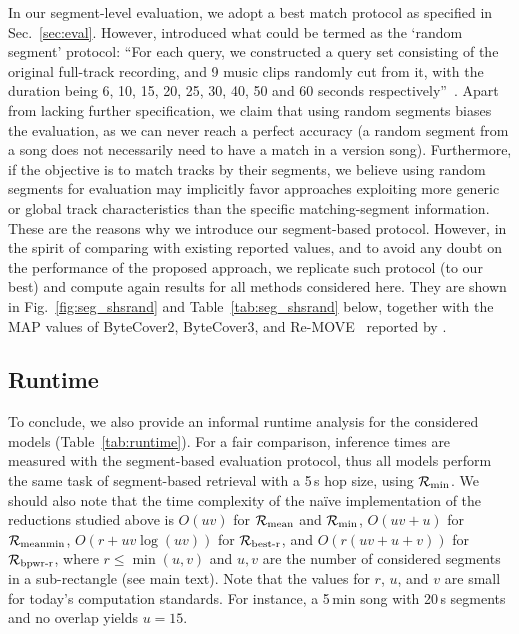In our segment-level evaluation, we adopt a best match protocol as specified in Sec.~\ref{sec:eval}. However, \citet{du_bytecover3_2023} introduced what could be termed as the `random segment' protocol: ``For each query, we constructed a query set consisting of the original full-track recording, and 9 music clips randomly cut from it, with the duration being 6, 10, 15, 20, 25, 30, 40, 50 and 60 seconds respectively''~\cite{du_bytecover3_2023}. Apart from lacking further specification, we claim that using random segments biases the evaluation, as we can never reach a perfect accuracy (a random segment from a song does not necessarily need to have a match in a version song). Furthermore, if the objective is to match tracks by their segments, we believe using random segments for evaluation may implicitly favor approaches exploiting more generic or global track characteristics than the specific matching-segment information. These are the reasons why we introduce our segment-based protocol. However, in the spirit of comparing with existing reported values, and to avoid any doubt on the performance of the proposed approach, we replicate such protocol (to our best) and compute again results for all methods considered here. They are shown in Fig.~\ref{fig:seg_shsrand} and Table~\ref{tab:seg_shsrand} below, together with the MAP values of ByteCover2, ByteCover3, and Re-MOVE~\cite{yesiler_less_2020} reported by \citet{du_bytecover3_2023}.

\subsection{Runtime}

To conclude, we also provide an informal runtime analysis for the considered models (Table~\ref{tab:runtime}). For a fair comparison, inference times are measured with the segment-based evaluation protocol, thus all models perform the same task of segment-based retrieval with a 5\,s hop size, using $\mathcal{R}_{\text{min}}$. We should also note that the time complexity of the naïve implementation of the reductions studied above is $O(uv)$ for $\mathcal{R}_{\text{mean}}$ and  $\mathcal{R}_{\text{min}}$, $O(uv+u)$ for $\mathcal{R}_{\text{meanmin}}$, $O(r+uv\log(uv))$ for $\mathcal{R}_{\text{best-r}}$, and $O(r(uv+u+v))$ for $\mathcal{R}_{\text{bpwr-r}}$, where $r\leq\min(u,v)$ and $u,v$ are the number of considered segments in a sub-rectangle (see main text). Note that the values for $r$, $u$, and $v$ are small for today's computation standards. For instance, a 5\,min song with 20\,s segments and no overlap yields $u=15$.


